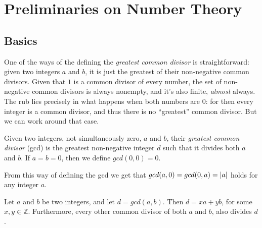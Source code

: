 
\chapter{Preliminaries on Number Theory}
\label{cha:prelim_nt}

\section{Basics}
  \label{sec:PNT:Basics}
  One of the ways of the defining the \emph{greatest common divisor} is straightforward: given two integers $a$ and $b$, it is just the greatest of their non-negative common divisors. Given that $1$ is a common divisor of every number, the set of non-negative common divisors is always nonempty, and it's also finite, \emph{almost} always. The rub lies precisely in what happens when both numbers are $0$: for then every integer is a common divisor, and thus there is no ``greatest'' common divisor. But we can work around that case.
  \begin{definition}
    \label{def:gcd}
    Given two integers, not simultaneously zero, $a$ and $b$, their \emph{greatest common divisor} (gcd) is the greatest non-negative integer $d$ such that it divides both $a$ and $b$. If $a = b = 0$, then we define $gcd(0, 0) = 0$.
  \end{definition}
  \noindent From this way of defining the gcd we get that $gcd(a, 0) = gcd(0, a) = \lvert a\rvert$ holds for any integer $a$.
  \begin{theorem}
    \label{thm:gcd1}
    Let $a$ and $b$ be two integers, and let $d = gcd(a, b)$. Then $d=xa+yb$, for some $x, y \in \mathbb{Z}$. Furthermore, every other common divisor of both $a$ and $b$, also divides $d$.
  \end{theorem}
